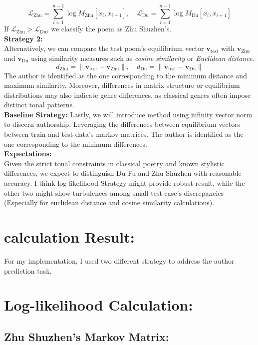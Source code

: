 \documentclass[12pt]{article}
\begin{document}
\[
    \mathcal{L}_{\text{Zhu}} = \sum_{i=1}^{n-1} \log M_{\text{Zhu}}[x_i, x_{i+1}], \quad \mathcal{L}_{\text{Du}} = \sum_{i=1}^{n-1} \log M_{\text{Du}}[x_i, x_{i+1}]
\]
If $\mathcal{L}_{\text{Zhu}} > \mathcal{L}_{\text{Du}}$, we classify the poem as Zhu Shuzhen's.
\\
\textbf{Strategy 2: }
\\
Alternatively, we can compare the test poem’s equilibrium vector $\mathbf{v}_{\text{test}}$ with $\mathbf{v}_{\text{Zhu}}$ and $\mathbf{v}_{\text{Du}}$ using similarity measures such as \textit{cosine similarity} or \textit{Euclidean distance}.
\[
    d_{\text{Zhu}} = \|\mathbf{v}_{\text{test}} - \mathbf{v}_{\text{Zhu}}\|, \quad d_{\text{Du}} = \|\mathbf{v}_{\text{test}} - \mathbf{v}_{\text{Du}}\|
\]
The author is identified as the one corresponding to the minimum distance and maximum similarity. Moreover, differences in matrix structure or equilibrium distributions may also indicate genre differences, as classical genres often impose distinct tonal patterns.
\\
\textbf{Baseline Strategy: }
Lastly, we will introduce method using infinity vector norm to discern authorship. Leveraging the differences between equilibrium vectors between train and test data's markov matrices.
The author is identified as the one corresponding to the minimum differences.
\\
\textbf{Expectations: }
\\
Given the strict tonal constraints in classical poetry and known stylistic differences, we expect to distinguish Du Fu and Zhu Shuzhen with reasonable accuracy. 
I think log-likelihood Strategy might provide robust result, while the other two might show turbulences among small test-case's discrepancies (Especially for euclidean distance and cosine similarity calculations).

\newpage

\section{calculation Result: }
\noindent For my implementation, I used two different strategy to address the author prediction task.

\section*{Log-likelihood Calculation: }

\subsection*{Zhu Shuzhen's Markov Matrix:}
\end{document}
